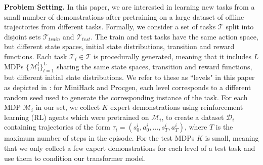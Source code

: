 \textbf{Problem Setting.}
In this paper, we are interested in learning new tasks from a small number of demonstrations after pretraining on a large dataset of offline trajectories from different tasks. Formally, we consider a set of tasks $\mathcal{T}$ split into disjoint sets $\mathcal{T}_{train}$ and $\mathcal{T}_{test}$.
The train and test tasks have the same action space, but different state spaces, initial state distributions, transition and reward functions. Each task $\mathcal{T}_i \in \mathcal{T}$ is procedurally generated, meaning that it includes $L$ MDPs $\{\mathcal{M}_i^l\}_{l=1}^L$ sharing the same state spaces, transition and reward functions, but different initial state distributions. We refer to these as ``levels" in this paper as depicted in : for MiniHack and Procgen, each level corresponds to a different random seed used to generate the corresponding instance of the task. For each MDP $\mathcal{M}_i$ in our set, we collect $K$ expert demonstrations using reinforcement learning (RL) agents which were pretrained on $\mathcal{M}_i$, to create a dataset $\mathcal{D}_i$ containing trajectories of the form $\tau_i = (s_0^i, a_0^i, \ldots, s_T^i, a_T^i)$, where $T$ is the maximum number of steps in the episode. For the test MDPs $K$ is small, meaning that we only collect a few expert demonstrations for each level of a test task and use them to condition our transformer model. 
 
